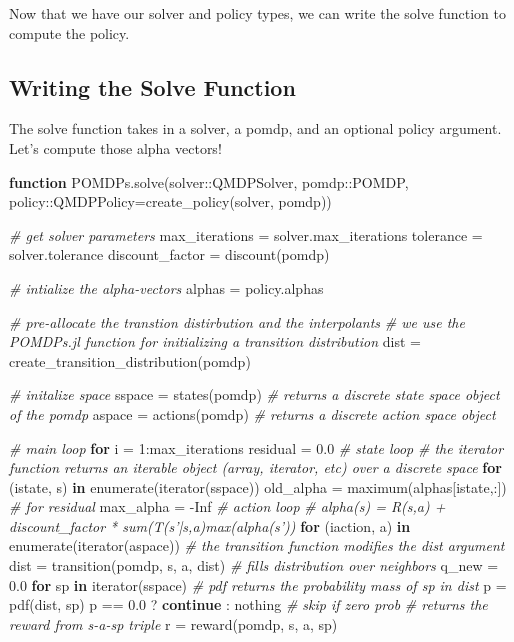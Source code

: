 \documentclass[12pt,]{article}
\newenvironment{Shaded}{}{}
\newcommand{\KeywordTok}[1]{\textcolor[rgb]{0.00,0.44,0.13}{\textbf{{#1}}}}
\newcommand{\FloatTok}[1]{\textcolor[rgb]{0.25,0.63,0.44}{{#1}}}
\newcommand{\CommentTok}[1]{\textcolor[rgb]{0.38,0.63,0.69}{\textit{{#1}}}}
\newcommand{\NormalTok}[1]{{#1}}
\begin{document}
Now that we have our solver and policy types, we can write the solve
function to compute the policy.

\subsection{Writing the Solve
Function}\label{writing-the-solve-function}

The solve function takes in a solver, a pomdp, and an optional policy
argument. Let's compute those alpha vectors!

\begin{Shaded}
\begin{Highlighting}[]
\KeywordTok{function} \NormalTok{POMDPs.solve(solver::QMDPSolver, pomdp::POMDP, policy::QMDPPolicy=create_policy(solver, pomdp))}

    \CommentTok{# get solver parameters}
    \NormalTok{max_iterations = solver.max_iterations}
    \NormalTok{tolerance = solver.tolerance}
    \NormalTok{discount_factor = discount(pomdp)}

    \CommentTok{# intialize the alpha-vectors}
    \NormalTok{alphas = policy.alphas}

    \CommentTok{# pre-allocate the transtion distirbution and the interpolants}
    \CommentTok{# we use the POMDPs.jl function for initializing a transition distribution    }
    \NormalTok{dist = create_transition_distribution(pomdp)}

    \CommentTok{# initalize space}
    \NormalTok{sspace = states(pomdp)  }\CommentTok{# returns a discrete state space object of the pomdp}
    \NormalTok{aspace = actions(pomdp) }\CommentTok{# returns a discrete action space object}

    \CommentTok{# main loop}
    \KeywordTok{for} \NormalTok{i = }\FloatTok{1}\NormalTok{:max_iterations}
        \NormalTok{residual = }\FloatTok{0.0}
        \CommentTok{# state loop}
        \CommentTok{# the iterator function returns an iterable object (array, iterator, etc) over a discrete space}
        \KeywordTok{for} \NormalTok{(istate, s) }\KeywordTok{in} \NormalTok{enumerate(iterator(sspace))}
            \NormalTok{old_alpha = maximum(alphas[istate,:]) }\CommentTok{# for residual }
            \NormalTok{max_alpha = -Inf}
            \CommentTok{# action loop}
            \CommentTok{# alpha(s) = R(s,a) + discount_factor * sum(T(s'|s,a)max(alpha(s'))}
            \KeywordTok{for} \NormalTok{(iaction, a) }\KeywordTok{in} \NormalTok{enumerate(iterator(aspace))}
                \CommentTok{# the transition function modifies the dist argument}
                \NormalTok{dist = transition(pomdp, s, a, dist) }\CommentTok{# fills distribution over neighbors}
                \NormalTok{q_new = }\FloatTok{0.0}
                \KeywordTok{for} \NormalTok{sp }\KeywordTok{in} \NormalTok{iterator(sspace)}
                    \CommentTok{# pdf returns the probability mass of sp in dist}
                    \NormalTok{p = pdf(dist, sp)}
                    \NormalTok{p == }\FloatTok{0.0} \NormalTok{? }\KeywordTok{continue} \NormalTok{: nothing }\CommentTok{# skip if zero prob}
                    \CommentTok{# returns the reward from s-a-sp triple}
                    \NormalTok{r = reward(pomdp, s, a, sp)}
    

\end{Highlighting}
\end{Shaded}
\end{document}
